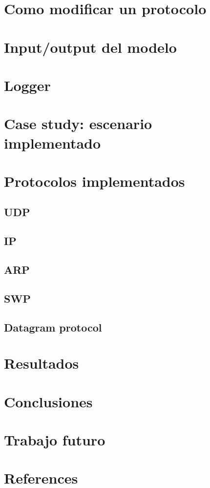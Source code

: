 \documentclass[10pt,a4paper]{article}
\begin{document}
\section{Como modificar un protocolo}
\section{Input/output del modelo}
\section{Logger}
\section{Case study: escenario implementado}
\section{Protocolos implementados}
\subsection{UDP}
\subsection{IP}
\subsection{ARP}
\subsection{SWP}
\subsection{Datagram protocol}
\section{Resultados}
\section{Conclusiones}
\section{Trabajo futuro}
\section{References}


\end{document}
